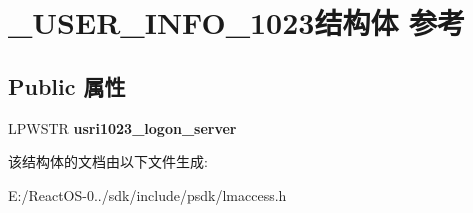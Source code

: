 \hypertarget{struct___u_s_e_r___i_n_f_o__1023}{}\section{\+\_\+\+U\+S\+E\+R\+\_\+\+I\+N\+F\+O\+\_\+1023结构体 参考}
\label{struct___u_s_e_r___i_n_f_o__1023}
\subsection*{Public 属性}
\begin{DoxyCompactItemize}
\item 
\mbox{\label{struct___u_s_e_r___i_n_f_o__1023_a3825e8f9b168e1b8b8ed8377e2bf5a10}} 
L\+P\+W\+S\+TR {\bfseries usri1023\+\_\+logon\+\_\+server}
\end{DoxyCompactItemize}


该结构体的文档由以下文件生成\+:\begin{DoxyCompactItemize}
\item 
E\+:/\+React\+O\+S-\/0../sdk/include/psdk/lmaccess.\+h\end{DoxyCompactItemize}
